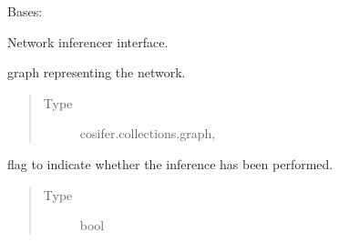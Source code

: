 \documentclass[letterpaper,10pt,english]{sphinxmanual}
\begin{document}
\begin{fulllineitems}
\label{\detokenize{_modules/cosifer.inferencers:cosifer.inferencers.network_inferencer.NetworkInferencer}}
Bases: {\hyperref[\detokenize{_modules/cosifer.handlers:cosifer.handlers.network_handler.NetworkHandler}]{}}

Network inferencer interface.

\begin{fulllineitems}
\label{\detokenize{_modules/cosifer.inferencers:cosifer.inferencers.network_inferencer.NetworkInferencer.graph}}
graph representing the
network.
\begin{quote}\begin{description}
\item[{Type}] \leavevmode
cosifer.collections.graph,{\hyperref[\detokenize{_modules/cosifer.collections:cosifer.collections.graph.Graph}]{}}

\end{description}\end{quote}

\end{fulllineitems}


\begin{fulllineitems}
\label{\detokenize{_modules/cosifer.inferencers:cosifer.inferencers.network_inferencer.NetworkInferencer.trained}}
flag to indicate whether the inference has been
performed.
\begin{quote}\begin{description}
\item[{Type}] \leavevmode
bool

\end{description}\end{quote}


\end{fulllineitems}
\end{fulllineitems}
\end{document}

